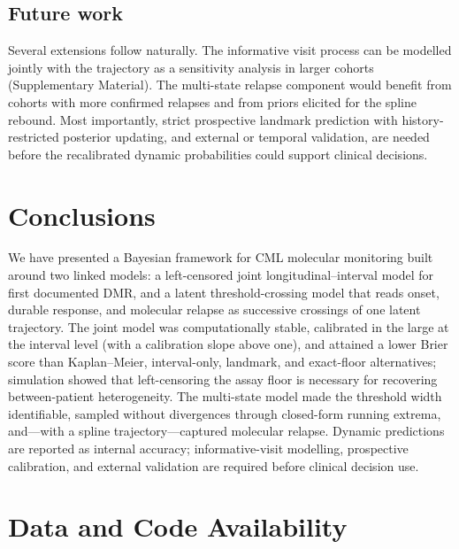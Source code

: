 \documentclass[11pt]{article}
\begin{document}
\subsection{Future work}

Several extensions follow naturally. The informative visit process can be
modelled jointly with the trajectory as a sensitivity analysis in larger
cohorts (Supplementary Material). The multi-state relapse component would
benefit from cohorts with more confirmed relapses and from priors elicited for
the spline rebound. Most importantly, strict prospective landmark prediction
with history-restricted posterior updating, and external or temporal
validation, are needed before the recalibrated dynamic probabilities could
support clinical decisions.

\section{Conclusions}

We have presented a Bayesian framework for CML molecular monitoring built
around two linked models: a left-censored joint longitudinal--interval model
for first documented DMR, and a latent threshold-crossing model that reads
onset, durable response, and molecular relapse as successive crossings of one
latent trajectory. The joint model was computationally stable, calibrated in the large at the
interval level (with a calibration slope above one), and attained a lower Brier
score than Kaplan--Meier, interval-only, landmark, and exact-floor
alternatives; simulation showed that left-censoring the assay floor is
necessary for recovering between-patient heterogeneity. The multi-state model
made the threshold width identifiable, sampled without divergences through
closed-form running extrema, and---with a spline trajectory---captured
molecular relapse. Dynamic predictions are reported as internal accuracy;
informative-visit modelling, prospective calibration, and external validation
are required before clinical decision use.

\section*{Data and Code Availability}
\end{document}
